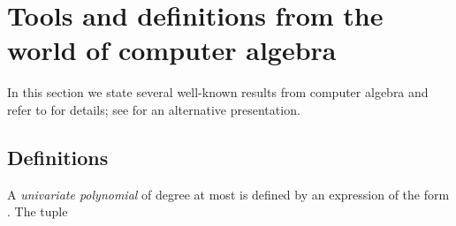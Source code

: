 \documentclass[11pt]{article}
\theoremstyle{remark}
\newcommand{\old}[1]{{{}}}
\begin{document}
\old{
\section{Other problems that we discussed}

\begin{enumerate}
\item
If we can do batched point location in the plane, then we may be able to improve the running time of the known algorithms for the maximum capacity problem, which is defined as follows.
Let  be a set of  pairs of points in the
plane representing  (directional) links. In a link , the point 
represents the receiver and the point  represents the sender.
The goal is to find a maximum cardinality subset
of links that can operate simultaneously in the SINR model.

\item
Can we say something on the following problem which we call
{\em maximum capacity with acknowledgment} and that seems to be new.
Find a maximum subset  of links that can operate simultaneously as follows.
In the first part of a round
all senders in  send their messages simultaneously to their corresponding receivers, and in the second part
all receivers in  acknowledge receipt of their messages simultaneously.

\item
We also tried to come up with some interesting problem, where we are given a set of transmitters  and a set of receivers , but not the transmitter-to-receiver matching.
   
\end{enumerate}
}

\newpage



\newpage
\appendix 

\section{Tools and definitions from the world of computer algebra}
In this section we state several well-known results from computer algebra and refer to \cite{gg-mca-99} for details; see \cite{bp-pmcfa-94} for an alternative presentation.  

\subsection{Definitions}
 
A \emph{univariate polynomial } of degree at most  is defined
by an expression of the form .  The
tuple 
 
\end{document}
